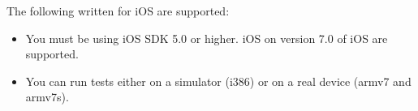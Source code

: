 The following \gdauts{} written for iOS are supported:

\begin{itemize}
\item You must be using iOS SDK 5.0 or higher. iOS \gdauts{} on version 7.0 of iOS are supported.
\item You can run tests either on a simulator (i386) or on a real device (armv7 and armv7s). 
\end{itemize}



